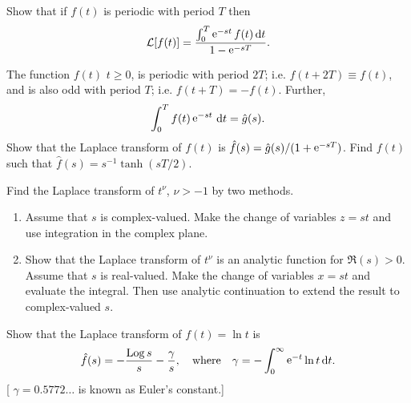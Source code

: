 {%
\begin{Exercise}
  \label{exercise L(f) f periodic}
  Show that if $f(t)$ is periodic with period $T$ then
  \[ 
  \mathcal{L}[f(t)] = \frac{\int_0^T \mathop{\mathrm{e}}\nolimits^{-s t} f(t)\,\mathrm{d} t}{1-\mathop{\mathrm{e}}\nolimits^{-s T}}.
  \]

\end{Exercise}




\begin{Exercise}
  \label{exercise L(f) f odd periodic}
  The function $f(t)$ $t \geq 0$, is periodic with period $2 T$; i.e.
  $f(t + 2 T) \equiv f(t)$, and is also odd with period $T$; i.e.
  $f(t + T) = -f(t)$.  Further,
  \[
  \int_0^T f(t) \mathop{\mathrm{e}}\nolimits^{-s t} \,\mathrm{d} t = \hat{g}(s).
  \]
  Show that the Laplace transform of $f(t)$ is 
  $\hat{f}(s) = \hat{g}(s) / (1 + \mathop{\mathrm{e}}\nolimits^{-s T})$.
  Find $f(t)$ such that $\hat{f}(s) = s^{-1} \tanh(s T / 2)$.

\end{Exercise}






\begin{Exercise}
  \label{exercise L(t nu)}
  Find the Laplace transform of $t^\nu$, $\nu > -1$ by two methods.  
  \begin{enumerate}
  \item 
    Assume that $s$ is complex-valued.  Make the change of variables 
    $z = s t$ and use integration in the complex plane.  
  \item 
    Show that the Laplace transform of $t^\nu$ is an analytic function for
    $\Re(s)>0$.
    Assume that $s$ is real-valued.  Make the change of variables
    $x = s t$ and evaluate the integral.  Then use analytic continuation to 
    extend the result to complex-valued $s$.
  \end{enumerate}

\end{Exercise}





\begin{Exercise}
  \label{exercise L(ln t)}
  Show that the Laplace transform of $f(t) = \ln t$ is
  \[
  \hat{f}(s) = - \frac{\mathop{\mathrm{Log}}\nolimits s}{s} - \frac{\gamma}{s}, \quad \mathrm{where} \quad
  \gamma = - \int_0^\infty \mathop{\mathrm{e}}\nolimits^{-t} \ln t \,\mathrm{d} t.
  \]
  [ $\gamma = 0.5772\ldots$ is known as Euler's constant.]
  

\end{Exercise}}
